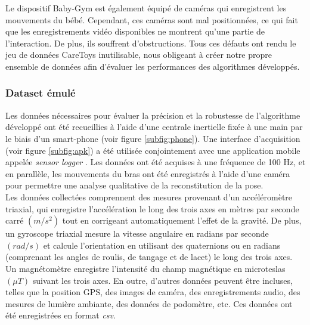 \documentclass[8pt]{article}
\begin{document}
Le dispositif Baby-Gym est également équipé de caméras qui enregistrent les mouvements du bébé. Cependant, ces caméras sont mal positionnées, ce qui fait que les enregistrements vidéo disponibles ne montrent qu'une partie de l'interaction. De plus, ils souffrent d'obstructions. Tous ces défauts ont rendu le jeu de données CareToys inutilisable, nous obligeant à créer notre propre ensemble de données afin d'évaluer les performances des algorithmes développés. 
\subsubsection{Dataset émulé}
Les données nécessaires pour évaluer la précision et la robustesse de l'algorithme développé ont été recueillies à l'aide d'une centrale inertielle fixée à une main par le biais d'un smart-phone (voir figure \ref{subfig:phone}). Une interface d'acquisition (voir figure \ref{subfig:apk}) a été utilisée conjointement avec une application mobile appelée \textit{sensor logger}  \cite{choi_awesome_2023}. Les données ont été acquises à une fréquence de 100 Hz, et en parallèle, les mouvements du bras ont été enregistrés à l'aide d'une caméra pour permettre une analyse qualitative de la reconstitution de la pose.\\
Les données collectées comprennent des mesures provenant d'un accéléromètre triaxial, qui enregistre l'accélération le long des trois axes en mètres par seconde carré $(m/s^2)$ tout en corrigeant automatiquement l'effet de la gravité. De plus, un gyroscope triaxial mesure la vitesse angulaire en radians par seconde $(rad/s)$ et calcule l'orientation en utilisant des quaternions ou en radians (comprenant les angles de roulis, de tangage et de lacet) le long des trois axes. Un magnétomètre enregistre l'intensité du champ magnétique en microteslas $(\mu T)$ suivant les trois axes. En outre, d'autres données peuvent être incluses, telles que la position GPS, des images de caméra, des enregistrements audio, des mesures de lumière ambiante, des données de podomètre, etc. Ces données ont été enregistrées en format \textit{csv}.
\end{document}

